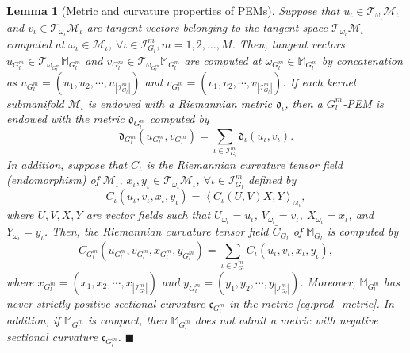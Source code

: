 \documentclass[10pt,journal,compsoc]{IEEEtran}
\newcommand{\Oi}{\omega_{\iota}}
\newtheorem{lemma}[theorem]{Lemma}
\theoremstyle{definition}
\theoremstyle{definition}
\theoremstyle{remark}
\theoremstyle{remark}
\theoremstyle{remark}
\newcommand*{\QEDbs}{\hfill\ensuremath{\blacksquare}}%
\begin{document}
\begin{lemma}[Metric and curvature properties of PEMs]
	\label{lemma32}
	Suppose that	$u_{\iota} \in \mathcal{T}_{\omega_{\iota}} \mathcal{M}_{\iota}$ and $v_{\iota} \in \mathcal{T}_{\omega_{\iota}} \mathcal{M}_{\iota}$ are tangent vectors belonging to the tangent space $\mathcal{T}_{\omega_{\iota}} \mathcal{M}_{\iota}$ computed at ${{\omega_{\iota}} \in \mathcal{M}_{\iota}}$, $\forall \iota \in \mathcal{I}^m_{{G}_l}, m=1,2,\ldots,M$. Then, tangent vectors ${u_{G^m_l} \in \mathcal{T}_{\omega_{G^m_l}} \mathbb{M}_{G^m_l}}$ and ${v_{G^m_l} \in \mathcal{T}_{\omega_{G^m_l}} \mathbb{M}_{G^m_l}}$ are computed at $\omega_{G^m_l} \in \mathbb{M}_{G^m_l}$ by concatenation as ${u_{G^m_l} = (u_1, u_2, \cdots, u_{|\mathcal{I}^m_{{G}_l}|})}$ and 
	${v_{G^m_l} = (v_1, v_2, \cdots, v_{|\mathcal{I}^m_{{G}_l}|})}$. If each kernel submanifold $\mathcal{M}_{\iota}$ is endowed with a Riemannian metric $\mathfrak{d}_{\iota}$, then a $G^m_l$-PEM is endowed with the metric $\mathfrak{d}_{G^m_l}$ computed by
	\begin{equation}
	\mathfrak{d}_{G^m_l} ( u_{G^m_l} , v_{G^m_l} ) = \sum \limits _{\iota \in \mathcal{I}^m_{{G}_l}} \mathfrak{d}_{\iota}(u_{\iota},v_{\iota}).
	\label{eq:prod_metric}
	\end{equation}
	In addition, suppose that $\bar{C}_{\iota}$ is the Riemannian curvature tensor field (endomorphism) \cite{lee2009manifolds} of $\mathcal{M}_{\iota}$,  ${x_{\iota}, y_{\iota} \in \mathcal{T}_{\omega_{\iota}} \mathcal{M}_{\iota}}$, $\forall \iota \in \mathcal{I}^m_{{G}_l}$ defined by
	\begin{equation}
	\bar{C}_{\iota}(u_{\iota},v_{\iota},x_{\iota},y_{\iota}) = \left\langle {C}_{\iota} (U,V)X,Y \right\rangle_{\Oi}, 
	\label{eq:R_tensor}
	\end{equation}
	where $U,V,X,Y$ are vector fields such that $U_{\Oi} = u_{\iota} $, $V_{\Oi} = v_{\iota} $, $X_{\Oi} = x_{\iota} $, and $Y_{\Oi} = y_{\iota} $. Then, the Riemannian curvature tensor field $\bar{C}_{G_l} $ of $\mathbb{M}_{G_l}$ is computed by
	\begin{equation}
	\bar{C}_{G^m_l} ( u_{G^m_l} , v_{G^m_l}, x_{G^m_l} , y_{G^m_l}  ) = \sum \limits _{\iota \in \mathcal{I}^m_{{G}_l}} \bar{C}_{\iota}(u_{\iota},v_{\iota},x_{\iota},y_{\iota}),
	\label{eq:curv_tensor}
	\end{equation}
	where  ${x_{G^m_l} = (x_1, x_2, \cdots, x_{|\mathcal{I}^m_{{G}_l}|})}$ and 
	${y_{G^m_l} = (y_1, y_2, \cdots, y_{|\mathcal{I}^m_{{G}_l}|})}$. 
	Moreover, $\mathbb{M}_{G^m_l}$ has never strictly positive sectional curvature $\mathfrak{c}_{G^m_l}$ in the metric \eqref{eq:prod_metric}. In addition, if $\mathbb{M}_{G^m_l}$ is compact, then $\mathbb{M}_{G^m_l}$ does not admit a metric with negative sectional curvature $\mathfrak{c}_{G^m_l}$. \QEDbs
\end{lemma}
\end{document}
